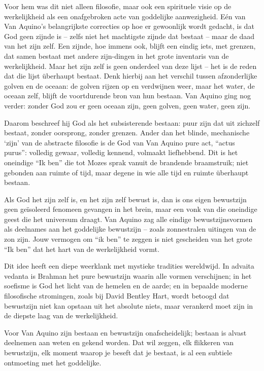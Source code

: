 Voor hem was dit niet alleen filosofie, maar ook een spirituele visie op de werkelijkheid als een onafgebroken acte van goddelijke aanwezigheid. Eén van Van Aquino’s belangrijkste correcties op hoe er gewoonlijk wordt gedacht, is dat God geen zijnde is – zelfs niet het machtigste zijnde dat bestaat – maar de daad van het zijn zelf. Een zijnde, hoe immens ook, blijft een eindig iets, met grenzen, dat samen bestaat met andere zijn-dingen in het grote inventaris van de werkelijkheid. Maar het zijn zelf is geen onderdeel van deze lijst – het is de reden dat die lijst überhaupt bestaat. Denk hierbij aan het verschil tussen afzonderlijke golven en de oceaan: de golven rijzen op en verdwijnen weer, maar het water, de oceaan zelf, blijft de voortdurende bron van hun bestaan. Van Aquino ging nog verder: zonder God zou er geen oceaan zijn, geen golven, geen water, geen zijn.

Daarom beschreef hij God als het subsisterende bestaan: puur zijn dat uit zichzelf bestaat, zonder oorsprong, zonder grenzen. Ander dan het blinde, mechanische ‘zijn’ van de abstracte filosofie is de God van Van Aquino pure act, “actus purus”: volledig gewaar, volledig kennend, volmaakt liefhebbend. Dit is het oneindige “Ik ben” die tot Mozes sprak vanuit de brandende braamstruik; niet gebonden aan ruimte of tijd, maar degene in wie alle tijd en ruimte überhaupt bestaan.

Als God het zijn zelf is, en het zijn zelf bewust is, dan is ons eigen bewustzijn geen geïsoleerd fenomeen gevangen in het brein, maar een vonk van die oneindige geest die het universum draagt. Van Aquino zag alle eindige bewustzijnsvormen als deelnames aan het goddelijke bewustzijn – zoals zonnestralen uitingen van de zon zijn. Jouw vermogen om “ik ben” te zeggen is niet gescheiden van het grote “Ik ben” dat het hart van de werkelijkheid vormt.

Dit idee heeft een diepe weerklank met mystieke tradities wereldwijd. In advaita vedanta is Brahman het pure bewustzijn waarin alle vormen verschijnen; in het soefisme is God het licht van de hemelen en de aarde; en in bepaalde moderne filosofische stromingen, zoals bij David Bentley Hart, wordt betoogd dat bewustzijn niet kan opstaan uit het absolute niets, maar verankerd moet zijn in de diepste laag van de werkelijkheid.

Voor Van Aquino zijn bestaan en bewustzijn onafscheidelijk; bestaan is alvast deelnemen aan weten en gekend worden. Dat wil zeggen, elk flikkeren van bewustzijn, elk moment waarop je beseft dat je bestaat, is al een subtiele ontmoeting met het goddelijke.

